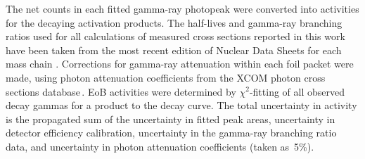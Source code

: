 The net  counts in each fitted gamma-ray photopeak were converted into  activities for the decaying  activation products.
% 
% 
% 
The   half-lives and gamma-ray branching ratios  used for all calculations of measured cross sections reported in this work  have been taken from the most recent edition of  Nuclear Data Sheets for each  mass chain
\cite{Singh2015a,Chen2011a,Wu2000,Burrows2007,Burrows2006,Burrows2008,Wang2017,Dong2015,Dong2014,JUNDE2008787,Junde2011,Bhat1998,Nesaraja2010,Browne2013,Zuber20151,NICHOLS2012973,ERJUN2001,Singh2007}.
Corrections for gamma-ray attenuation within each foil packet were made, using  photon attenuation coefficients from the XCOM photon cross sections database\,\cite{berger2011xcom}.
EoB activities were determined by $\chi^2$-fitting of all observed decay gammas for a product to the decay curve.
The total  uncertainty in  activity is the propagated sum of the uncertainty in  fitted peak areas, uncertainty in detector efficiency calibration,  uncertainty in the gamma-ray branching ratio data, and uncertainty in photon attenuation coefficients (taken as~5\%).




